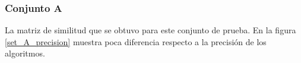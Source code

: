 \subsubsection{Conjunto A}
La matriz de similitud que se obtuvo para este conjunto de prueba. En la figura \ref{set_A_precision} muestra poca diferencia respecto a la precisión de los algoritmos.
\begin{figure}[!h]
\centering
{}
\hspace{-1.5cm}
\hspace{-1.5cm}
\end{figure}
